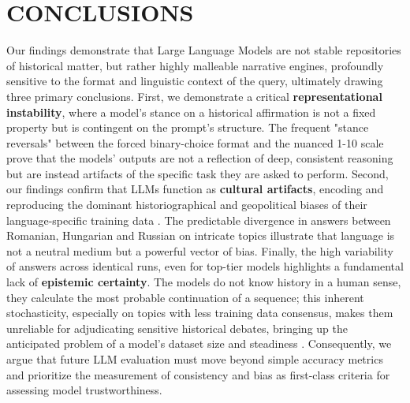 \documentclass[11pt]{article}
\begin{document}
\FloatBarrier

\section{\MakeUppercase{Conclusions}}
Our findings demonstrate that Large Language Models are not stable repositories of historical matter, but rather highly malleable narrative engines, profoundly sensitive to the format and linguistic context of the query, ultimately drawing three primary conclusions. First, we demonstrate a critical \textbf{representational instability}, where a model's stance on a historical affirmation is not a fixed property but is contingent on the prompt's structure. The frequent "stance reversals" between the forced binary-choice format and the nuanced 1-10 scale prove that the models' outputs are not a reflection of deep, consistent reasoning but are instead artifacts of the specific task they are asked to perform. Second, our findings confirm that LLMs function as \textbf{cultural artifacts}, encoding and reproducing the dominant historiographical and geopolitical biases of their language-specific training data \cite{gururangan2022}. The predictable divergence in answers between Romanian, Hungarian and Russian on intricate topics illustrate that language is not a neutral medium but a powerful vector of bias. Finally, the high variability of answers across identical runs, even for top-tier models highlights a fundamental lack of \textbf{epistemic certainty}. The models do not know history in a human sense, they calculate the most probable continuation of a sequence; this inherent stochasticity, especially on topics with less training data consensus, makes them unreliable for adjudicating sensitive historical debates, bringing up the anticipated problem of a model's dataset size and steadiness \cite{bender2021}. Consequently, we argue that future LLM evaluation must move beyond simple accuracy metrics and prioritize the measurement of consistency and bias as first-class criteria for assessing model trustworthiness.
\end{document}
